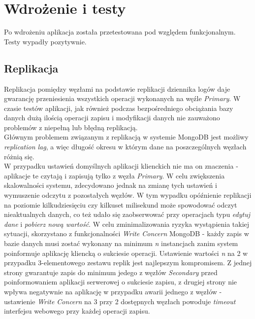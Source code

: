\section{Wdrożenie i testy}
Po wdrożeniu aplikacja została przetestowana pod względem funkcjonalnym. Testy wypadły pozytywnie.

\subsection{Replikacja}
Replikacja pomiędzy węzłami na podstawie replikacji dziennika logów daje gwarancję przeniesienia wszystkich operacji wykonanych na węźle \textit{Primary}. W czasie testów aplikacji, jak również podczas bezpośredniego obciążania bazy danych dużą ilością operacji zapisu i modyfikacji danych nie zauważono problemów z niepełną lub błędną replikacją. \\
Głównym problemem związanym z replikacją w systemie MongoDB jest możliwy \textit{replication lag}, a więc długość okresu w którym dane na poszczególnych węzłach różnią się. \\
W przypadku ustawień domyślnych aplikacji klienckich nie ma on znaczenia - aplikacje te czytają i zapisują tylko z węzła \textit{Primary}. W celu zwiększenia skalowalności systemu, zdecydowano jednak na zmianę tych ustawień i wymuszenie odczytu z pozostałych węzłów. W tym wypadku opóźnienie replikacji na poziomie kilkudziesięciu czy kilkuset milisekund może spowodować odczyt nieaktualnych danych, co też udało się zaobserwować przy operacjach typu \textit{edytuj dane} i \textit{pobierz nową wartość}. W celu zminimalizowania ryzyka wystąpienia takiej sytuacji, skorzystano z funkcjonalności \textit{Write Concern} MongoDB - każdy zapis w bazie danych musi zostać wykonany na minimum \textit{n} instancjach zanim system poinformuje aplikację kliencką o sukciesie operacji. Ustawienie wartości \textit{n} na 2 w przypadku 3-elementowego zestawu replik jest najlepszym kompromisem. Z jednej strony gwarantuje zapis do minimum jedego z węzłów \textit{Secondary} przed poinformowaniem aplikacji serwerowej o sukciesie zapisu, z drugiej strony nie wpływa negatywnie na aplikację w przypadku awarii jednego z węzłów - ustawienie \textit{Write Concern} na 3 przy 2 dostępnych węzłach powoduje \textit{timeout} interfejsu webowego przy każdej operacji zapisu.

